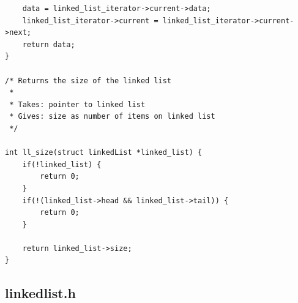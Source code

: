 \documentclass{article}
\begin{document}
\begin{verbatim}
    data = linked_list_iterator->current->data;
    linked_list_iterator->current = linked_list_iterator->current->next;
    return data;
}

/* Returns the size of the linked list
 *
 * Takes: pointer to linked list
 * Gives: size as number of items on linked list
 */

int ll_size(struct linkedList *linked_list) {
    if(!linked_list) {
        return 0;
    }
    if(!(linked_list->head && linked_list->tail)) {
        return 0;
    }
    
    return linked_list->size;
}

\end{verbatim}

\subsection*{linkedlist.h}
\end{document}
